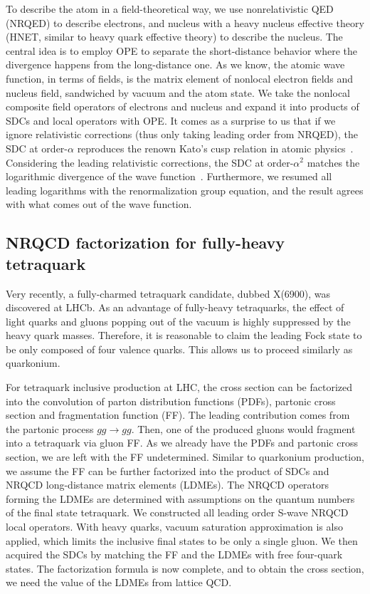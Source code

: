 \documentclass[letterpaper,11pt]{article}
\begin{document}
To describe the atom in a field-theoretical way, we use nonrelativistic QED (NRQED) to describe electrons, and nucleus with a heavy nucleus effective theory (HNET, similar to heavy quark effective theory) to describe the nucleus. The central idea is to employ OPE to separate the short-distance behavior where the divergence happens from the long-distance one. As we know, the atomic wave function, in terms of fields, is the matrix element of nonlocal electron fields and nucleus field, sandwiched by vacuum and the atom state. We take the nonlocal composite field operators of electrons and nucleus and expand it into products of SDCs and local operators with OPE. It comes as a surprise to us that if we ignore relativistic corrections (thus only taking leading order from NRQED), the SDC at order-$\alpha$ reproduces the renown Kato's cusp relation in atomic physics~\cite{Huang2018}. Considering the leading relativistic corrections, the SDC at order-$\alpha^2$ matches the logarithmic divergence of the wave function~\cite{Huang2018a,Huang2019}. Furthermore, we resumed all leading logarithms with the renormalization group equation, and the result agrees with what comes out of the wave function.

\subsection*{NRQCD factorization for fully-heavy tetraquark}
Very recently, a fully-charmed tetraquark candidate, dubbed X(6900),  was discovered at LHCb. As an advantage of fully-heavy tetraquarks, the effect of light quarks and gluons popping out of the vacuum is highly suppressed by the heavy quark masses. Therefore, it is reasonable to claim the leading Fock state to be only composed of four valence quarks. This allows us to proceed similarly as quarkonium.

For tetraquark inclusive production at LHC, the cross section can be factorized into the convolution of parton distribution functions (PDFs), partonic cross section and fragmentation function (FF). The leading contribution comes from the partonic process $gg\to gg$. Then, one of the produced gluons would fragment into a tetraquark via gluon FF. As we already have the PDFs and partonic cross section, we are left with the FF undetermined.
Similar to quarkonium production, we assume the FF can be further factorized into the product of SDCs and NRQCD long-distance matrix elements (LDMEs). The NRQCD operators forming the LDMEs are determined with assumptions on the quantum numbers of the final state tetraquark. We constructed all leading order S-wave NRQCD local operators. With heavy quarks, vacuum saturation approximation is also applied, which limits the inclusive final states to be only a single gluon. We then acquired the SDCs by matching the FF and the LDMEs with free four-quark states. The factorization formula is now complete, and to obtain the cross section, we need the value of the LDMEs from lattice QCD.
\end{document}
